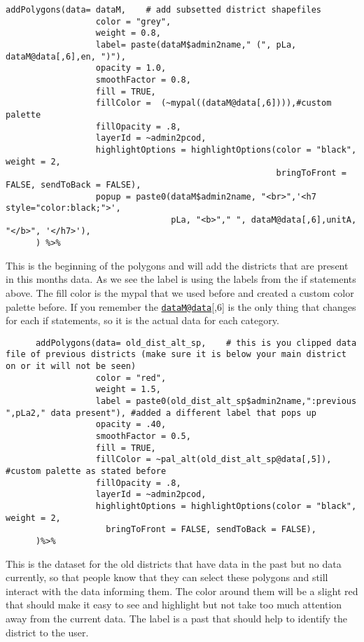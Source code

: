 \documentclass[
]{article}
\begin{document}
\begin{verbatim}
addPolygons(data= dataM,    # add subsetted district shapefiles
                  color = "grey",
                  weight = 0.8,
                  label= paste(dataM$admin2name," (", pLa, dataM@data[,6],en, ")"),
                  opacity = 1.0,
                  smoothFactor = 0.8,
                  fill = TRUE,
                  fillColor =  (~mypal((dataM@data[,6]))),#custom palette
                  fillOpacity = .8,
                  layerId = ~admin2pcod,
                  highlightOptions = highlightOptions(color = "black", weight = 2,
                                                      bringToFront = FALSE, sendToBack = FALSE),
                  popup = paste0(dataM$admin2name, "<br>",'<h7 style="color:black;">',
                                 pLa, "<b>"," ", dataM@data[,6],unitA, "</b>", '</h7>'),
      ) %>%
\end{verbatim}

This is the beginning of the polygons and will add the districts that
are present in this months data. As we see the label is using the labels
from the if statements above. The fill color is the mypal that we used
before and created a custom color palette before. If you remember the
\href{mailto:dataM@data}{\nolinkurl{dataM@data}}{[},6{]} is the only
thing that changes for each if statements, so it is the actual data for
each category.

\begin{verbatim}
      addPolygons(data= old_dist_alt_sp,    # this is you clipped data file of previous districts (make sure it is below your main district on or it will not be seen)
                  color = "red",
                  weight = 1.5,
                  label = paste0(old_dist_alt_sp$admin2name,":previous ",pLa2," data present"), #added a different label that pops up
                  opacity = .40,
                  smoothFactor = 0.5,
                  fill = TRUE,
                  fillColor = ~pal_alt(old_dist_alt_sp@data[,5]), #custom palette as stated before
                  fillOpacity = .8,
                  layerId = ~admin2pcod,
                  highlightOptions = highlightOptions(color = "black", weight = 2,
                    bringToFront = FALSE, sendToBack = FALSE),
      )%>%
\end{verbatim}

This is the dataset for the old districts that have data in the past but
no data currently, so that people know that they can select these
polygons and still interact with the data informing them. The color
around them will be a slight red that should make it easy to see and
highlight but not take too much attention away from the current data.
The label is a past that should help to identify the district to the
user.
\end{document}
